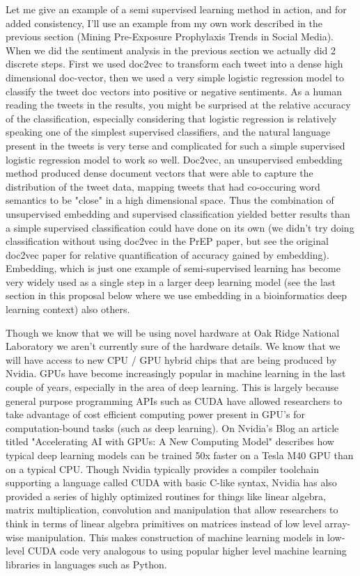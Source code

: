 Let me give an example of a semi supervised learning method in action, and for added consistency, I'll use an example from my own work described in the previous section (Mining Pre-Exposure Prophylaxis Trends in Social Media). When we did the sentiment analysis in the previous section we actually did 2 discrete steps. First we used doc2vec to transform each tweet into a dense high dimensional doc-vector, then we used a very simple logistic regression model to classify the tweet doc vectors into positive or negative sentiments. As a human reading the tweets in the results, you might be surprised at the relative accuracy of the classification, especially considering that logistic regression is relatively speaking one of the simplest supervised classifiers, and the natural language present in the tweets is very terse and complicated for such a simple supervised logistic regression model to work so well. Doc2vec, an unsupervised embedding method produced dense document vectors that were able to capture the distribution of the tweet data, mapping tweets that had co-occuring word semantics to be "close" in a high dimensional space. Thus the combination of unsupervised embedding and supervised classification yielded better results than a simple supervised classification could have done on its own (we didn't try doing classification without using doc2vec in the PrEP paper, but see the original doc2vec paper for relative quantification of accuracy gained by embedding\cite{le2014distributed}). Embedding, which is just one example of semi-supervised learning has become very widely used as a single step in a larger deep learning model (see the last section in this proposal below where we use embedding in a bioinformatics deep learning context) also others\cite{weston2012deep}.

Though we know that we will be using novel hardware at Oak Ridge National Laboratory we aren't currently sure of the hardware details. We know that we will have access to new CPU / GPU hybrid chips that are being produced by Nvidia. GPUs have become increasingly popular in machine learning in the last couple of years, especially in the area of deep learning. This is largely because general purpose programming APIs such as CUDA have allowed researchers to take advantage of cost efficient computing power present in GPU's for computation-bound tasks (such as deep learning). On Nvidia's Blog an article titled "Accelerating AI with GPUs: A New Computing Model" describes how typical deep learning models can be trained 50x faster on a Tesla M40 GPU than on a typical CPU. Though Nvidia typically provides a compiler toolchain supporting a language called CUDA with basic C-like syntax, Nvidia has also provided a series of highly optimized routines for things like linear algebra, matrix multiplication, convolution and manipulation that allow researchers to think in terms of linear algebra primitives on matrices instead of low level array-wise manipulation\cite{chetlur2014cudnn}. This makes construction of machine learning models in low-level CUDA code very analogous to using popular higher level machine learning libraries in languages such as Python.

